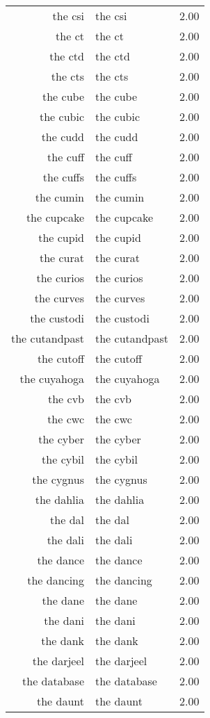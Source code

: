 \begin{table}[ht]
\begin{tabular}{rlr}
  the csi & the csi & 2.00 \\ 
  the ct & the ct & 2.00 \\ 
  the ctd & the ctd & 2.00 \\ 
  the cts & the cts & 2.00 \\ 
  the cube & the cube & 2.00 \\ 
  the cubic & the cubic & 2.00 \\ 
  the cudd & the cudd & 2.00 \\ 
  the cuff & the cuff & 2.00 \\ 
  the cuffs & the cuffs & 2.00 \\ 
  the cumin & the cumin & 2.00 \\ 
  the cupcake & the cupcake & 2.00 \\ 
  the cupid & the cupid & 2.00 \\ 
  the curat & the curat & 2.00 \\ 
  the curios & the curios & 2.00 \\ 
  the curves & the curves & 2.00 \\ 
  the custodi & the custodi & 2.00 \\ 
  the cutandpast & the cutandpast & 2.00 \\ 
  the cutoff & the cutoff & 2.00 \\ 
  the cuyahoga & the cuyahoga & 2.00 \\ 
  the cvb & the cvb & 2.00 \\ 
  the cwc & the cwc & 2.00 \\ 
  the cyber & the cyber & 2.00 \\ 
  the cybil & the cybil & 2.00 \\ 
  the cygnus & the cygnus & 2.00 \\ 
  the dahlia & the dahlia & 2.00 \\ 
  the dal & the dal & 2.00 \\ 
  the dali & the dali & 2.00 \\ 
  the dance & the dance & 2.00 \\ 
  the dancing & the dancing & 2.00 \\ 
  the dane & the dane & 2.00 \\ 
  the dani & the dani & 2.00 \\ 
  the dank & the dank & 2.00 \\ 
  the darjeel & the darjeel & 2.00 \\ 
  the database & the database & 2.00 \\ 
  the daunt & the daunt & 2.00 \\ 

\end{tabular}
\end{table}
